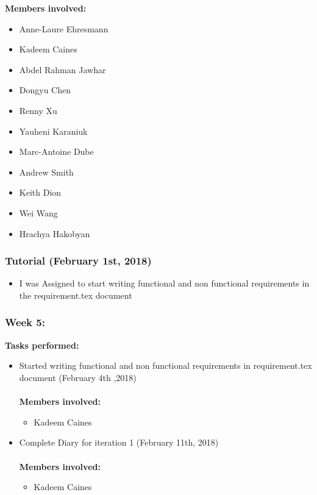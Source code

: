 \documentclass[11pt]{article}
\begin{document}
\textbf{Members involved:}

\begin{itemize}
    \item Anne-Laure	Ehresmann
    \item Kadeem	Caines
\item Abdel Rahman	Jawhar
\item Dongyu	Chen
\item Renny	Xu
\item Yauheni	Karaniuk
\item Marc-Antoine	Dube
\item Andrew	Smith
\item  Keith	Dion
\item   Wei	Wang
\item Hrachya	Hakobyan
\end{itemize}


\subsubsection{Tutorial (February 1st, 2018)}
\begin{itemize}
    \item I was Assigned to start writing functional and non functional requirements in the requirement.tex document
\end{itemize}

\subsubsection{Week 5:}

\textbf{Tasks performed:}
\begin{itemize}
    \item Started writing functional and non functional requirements in requirement.tex document (February 4th ,2018) \\ \\
\textbf{Members involved:}
\begin{itemize}
    \item Kadeem Caines
\end{itemize}
    \item Complete Diary for iteration 1 (February 11th, 2018)
    \\ \\
\textbf{Members involved:}
\begin{itemize}
    \item Kadeem Caines
\end{itemize}
\end{itemize}
\end{document}
